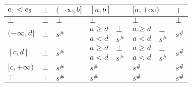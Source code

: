 \documentclass{article}
\begin{document}
\begin{table}[]
    \begin{tabular}{|l|l|l|ll|ll|l|}
    \hline
    $e_1 < e_2$                     & $\bot$                  & $(-\infty, b]$          & \multicolumn{2}{l|}{$[a, b]$} & \multicolumn{2}{l|}{$[a, +\infty)$} & $\top$                  \\ \hline
    $\bot$                          & $\bot$                  & $\bot$                  & \multicolumn{2}{l|}{$\bot$}   & \multicolumn{2}{l|}{$\bot$}         & $\bot$                  \\ \hline
    \multirow{2}{*}{$(-\infty, d]$} & \multirow{2}{*}{$\bot$} & \multirow{2}{*}{$s^\#$} & $a \ge d$       & $\bot$      & $a \ge d$          & $\bot$         & \multirow{2}{*}{$s^\#$} \\
                                    &                         &                         & $a < d$         & $s^\#$      & $a < d$            & $s^\#$         &                         \\ \hline
    \multirow{2}{*}{$[c, d]$}       & \multirow{2}{*}{$\bot$} & \multirow{2}{*}{$s^\#$} & $a \ge d$       & $\bot$      & $a \ge d$          & $\bot$         & \multirow{2}{*}{$s^\#$} \\
                                    &                         &                         & $a < d$         & $s^\#$      & $a < d$            & $s^\#$         &                         \\ \hline
    $[c, +\infty)$                  & $\bot$                  & $s^\#$                  & \multicolumn{2}{l|}{$s^\#$}   & \multicolumn{2}{l|}{$s^\#$}         & $s^\#$                  \\ \hline
    $\top$                          & $\bot$                  & $s^\#$                  & \multicolumn{2}{l|}{$s^\#$}   & \multicolumn{2}{l|}{$s^\#$}         & $s^\#$                  \\ \hline
    \end{tabular}
    \end{table}
\end{document}
